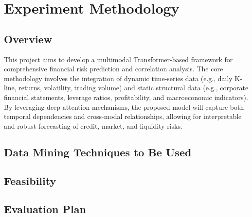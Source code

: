 \section{Experiment Methodology}
\label{sec:Experiment Methodology}
\subsection{Overview}
This project aims to develop a multimodal Transformer-based framework for comprehensive financial risk prediction and correlation analysis.
The core methodology involves the integration of dynamic time-series data (e.g., daily K-line, returns, volatility, trading volume) and static structural data (e.g., corporate financial statements, leverage ratios, profitability, and macroeconomic indicators).
By leveraging deep attention mechanisms, the proposed model will capture both temporal dependencies and cross-modal relationships, allowing for interpretable and robust forecasting of credit, market, and liquidity risks.

\subsection{Data Mining Techniques to Be Used}

\subsection{Feasibility}

\subsection{Evaluation Plan}

